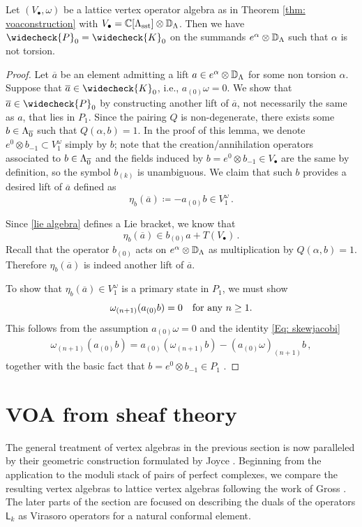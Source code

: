 \documentclass[a4paper, 12pt]{amsart}
\begin{document}
\begin{proposition}\label{prop: primaryomegabracket}
Let $(V_\bullet, \omega)$ be a lattice vertex operator algebra as in Theorem \ref{thm: voaconstruction} with $V_\bullet={\mathbb{C}}[\Lambda_{\text{sst}}]\otimes {\mathbb{D}}_\Lambda$. Then we have $\widecheck{P}_0=\widecheck{K}_0$ on the summands $e^\alpha\otimes {\mathbb{D}}_\Lambda$ such that $\alpha$ is not torsion.
\end{proposition}
\begin{proof}
Let $\overline{a}$ be an element admitting a lift $a\in e^\alpha\otimes {\mathbb{D}}_\Lambda$ for some non torsion $\alpha$. Suppose that $\overline{a}\in \widecheck{K}_0$, i.e., $a_{(0)}\omega=0$. We show that $\overline{a}\in \widecheck{P}_0$ by constructing another lift of $\overline{a}$, not necessarily the same as $a$, that lies in $P_1$. Since the pairing $Q$ is non-degenerate, there exists some $b\in \Lambda_{\overline{0}}$ such that $Q(\alpha,b)=1$. In the proof of this lemma, we denote $e^0\otimes b_{-1}\subset V_1^\omega$ simply by $b$; note that the creation/annihilation operators associated to $b\in \Lambda_{\overline{0}}$ and the fields induced by $b=e^0\otimes b_{-1}\in V_\bullet$ are the same by definition, so the symbol $b_{(k)}$ is unambiguous. We claim that such $b$ provides a desired lift of $\overline{a}$ defined as
$$\eta_b(\overline{a})\coloneqq -a_{(0)}b\in V^\omega_1\,.
$$

Since \eqref{lie algebra} defines a Lie bracket, we know that 
$$
    \eta_b(\overline{a}) \in b_{(0)}a+T(V_\bullet)\,.
$$
Recall that the operator $b_{(0)}$ acts on $e^\alpha\otimes {\mathbb{D}}_\Lambda$ as multiplication by $Q(\alpha,b)=1$. Therefore $\eta_b(\overline{a})$ is indeed another lift of $\overline{a}$. 

To show that $\eta_b(\overline{a})\in V^\omega_1$ is a primary state in $P_1$, we must show
$$\omega_{(n+1)}(a_{(0)}b)=0\quad  \textnormal{for any }  n\geq 1.
$$
This follows from the assumption $a_{(0)}\omega=0$ and the identity \eqref{Eq: skewjacobi}
\begin{align*}
    \omega_{(n+1)}(a_{(0)}b)
    =a_{(0)}(\omega_{(n+1)}b)-(a_{(0)}\omega)_{(n+1)}b\,,
\end{align*}
together with the basic fact that $b=e^0\otimes b_{-1}\in P_1$ \cite[page 81]{Ka98}. 
\end{proof}


\section{VOA from sheaf theory}\label{sec: VOA from sheaf theory}
The general treatment of vertex algebras in the previous section is now paralleled by their geometric construction formulated by Joyce \cite{Jo17}. Beginning from the application to the moduli stack of pairs of perfect complexes, we compare the resulting vertex algebras to lattice vertex algebras following the work of Gross \cite{Gr19}. The later parts of the section are focused on describing the duals of the operators $\mathsf{L}_k$ as Virasoro operators for a natural conformal element. 
\end{document}
